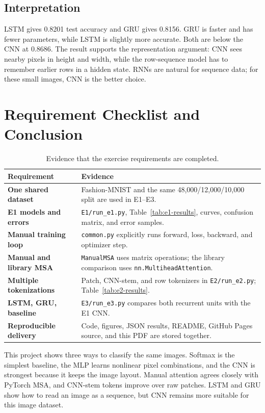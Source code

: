 \documentclass[oneside]{hcmut-report}
\begin{document}
\subsection{Interpretation}
LSTM gives 0.8201 test accuracy and GRU gives 0.8156. GRU is faster and has fewer parameters, while LSTM is slightly more accurate. Both are below the CNN at 0.8686. The result supports the representation argument: CNN sees nearby pixels in height and width, while the row-sequence model has to remember earlier rows in a hidden state. RNNs are natural for sequence data; for these small images, CNN is the better choice.

\clearpage
\section{Requirement Checklist and Conclusion}
\begin{table}[H]\centering\small
\caption{Evidence that the exercise requirements are completed.}
\begin{tabularx}{\textwidth}{>{\bfseries}p{3.25cm}X}\toprule
\textbf{Requirement} & \textbf{Evidence} \\\midrule
One shared dataset & Fashion-MNIST and the same 48,000/12,000/10,000 split are used in E1--E3. \\
E1 models and errors & \texttt{E1/run\_e1.py}, Table~\ref{tab:e1-results}, curves, confusion matrix, and error samples. \\
Manual training loop & \texttt{common.py} explicitly runs forward, loss, backward, and optimizer step. \\
Manual and library MSA & \texttt{ManualMSA} uses matrix operations; the library comparison uses \texttt{nn.MultiheadAttention}. \\
Multiple tokenizations & Patch, CNN-stem, and row tokenizers in \texttt{E2/run\_e2.py}; Table~\ref{tab:e2-results}. \\
LSTM, GRU, baseline & \texttt{E3/run\_e3.py} compares both recurrent units with the E1 CNN. \\
Reproducible delivery & Code, figures, JSON results, README, GitHub Pages source, and this PDF are stored together. \\\bottomrule
\end{tabularx}\end{table}

This project shows three ways to classify the same images. Softmax is the simplest baseline, the MLP learns nonlinear pixel combinations, and the CNN is strongest because it keeps the image layout. Manual attention agrees closely with PyTorch MSA, and CNN-stem tokens improve over raw patches. LSTM and GRU show how to read an image as a sequence, but CNN remains more suitable for this image dataset.
\end{document}
